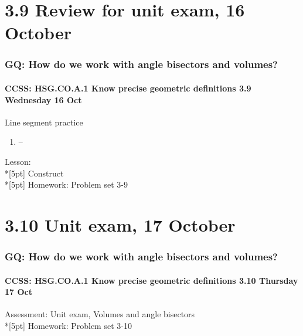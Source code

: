 \documentclass{beamer}
\begin{document}
\section{3.9 Review for unit exam, 16 October}
  \frame
  {
    \frametitle{GQ: How do we work with angle bisectors and volumes?}
    \framesubtitle{CCSS: HSG.CO.A.1 Know precise geometric definitions \hfill \alert{3.9 Wednesday 16 Oct}}

    \begin{block}{Line segment practice}
    \begin{enumerate}
      \item --
    \end{enumerate}
    \end{block}
    Lesson:   \\*[5pt]
    Construct\\*[5pt]
    Homework: Problem set 3-9
  }

\section{3.10 Unit exam, 17 October}
    \frame
    {
      \frametitle{GQ: How do we work with angle bisectors and volumes?}
      \framesubtitle{CCSS: HSG.CO.A.1 Know precise geometric definitions \hfill \alert{3.10 Thursday 17 Oct}}

      Assessment: Unit exam, Volumes and angle bisectors\\*[5pt]
      Homework: Problem set 3-10
    }
\end{document}
